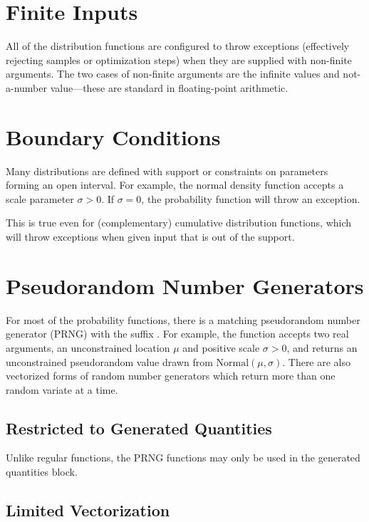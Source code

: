 \begin{description}
{\begin{description}
\section{Finite Inputs}


All of the distribution functions are configured to throw exceptions (effectively rejecting samples or optimization steps) when they are supplied with non-finite arguments.  The two cases of non-finite arguments are the infinite values and not-a-number value---these are standard in floating-point arithmetic.


\section{Boundary Conditions}


Many distributions are defined with support or constraints on parameters forming an open interval.  For example, the normal density function accepts a scale parameter $\sigma > 0$.  If $\sigma = 0$, the probability function will throw an exception.


This is true even for (complementary) cumulative distribution functions, which will throw exceptions when given input that is out of the support.


\section{Pseudorandom Number Generators}\label{distributions-prng.section}


For most of the probability functions, there is a matching pseudorandom number generator (PRNG) with the suffix . For example, the function  accepts two real arguments, an unconstrained location $\mu$ and positive scale $\sigma > 0$, and returns an unconstrained pseudorandom value drawn from $\text{Normal}(\mu,\sigma)$.  There are also vectorized forms of random number generators which return more than one random variate at a time.


\subsection{Restricted to Generated Quantities}


Unlike regular functions, the PRNG functions may only be used in the generated quantities block.


\subsection{Limited Vectorization}



\end{description}}
\end{description}
